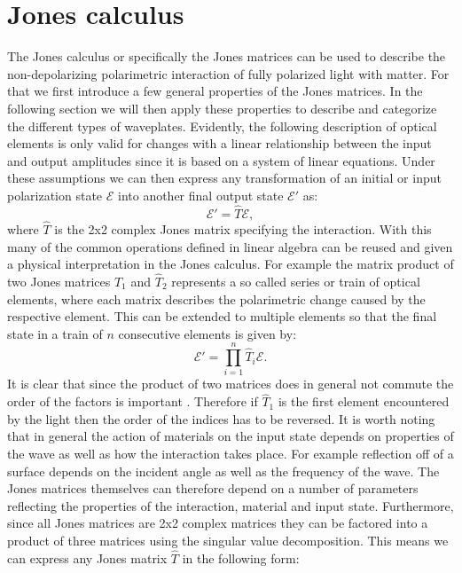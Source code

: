 
\section{Jones calculus}
\label{sec:jonescalc}
The Jones calculus or specifically the Jones matrices can be used to describe the non-depolarizing polarimetric interaction of fully polarized light with matter. For that we first introduce a few general properties of the Jones matrices. In the following section we will then apply these properties to describe and categorize the different types of waveplates. Evidently, the following description of optical elements is only valid for changes with a linear relationship between the input and output amplitudes since it is based on a system of linear equations. Under these assumptions we can then express any transformation of an initial or input polarization state $\bm{\mathcal{E}}$ into another final output state $\bm{\mathcal{E}}'$ as:
\begin{equation}
    \bm{\mathcal{E}}' = \hat{T} \bm{\mathcal{E}},
\end{equation}
where $\hat{T}$ is the 2x2 complex Jones matrix specifying the interaction. With this many of the common operations defined in linear algebra can be reused and given a physical interpretation in the Jones calculus. For example the matrix product of two Jones matrices $\hat{T}_1$ and $\hat{T}_2$ represents a so called series or train of optical elements, where each matrix describes the polarimetric change caused by the respective element. This can be extended to multiple elements so that the final state in a train of $n$ consecutive elements is given by:
\begin{equation}
    \label{eq:jones_series_product}
    \bm{\mathcal{E}}' = \prod_{i=1}^{n} \hat{T}_i \bm{\mathcal{E}}.
\end{equation}
It is clear that since the product of two matrices does in general not commute the order of the factors is important \cite{Jones1941}. Therefore if $\hat{T}_1$ is the first element encountered by the light then the order of the indices has to be reversed. It is worth noting that in general the action of materials on the input state depends on properties of the wave as well as how the interaction takes place. For example reflection off of a surface depends on the incident angle as well as the frequency of the wave. The Jones matrices themselves can therefore depend on a number of parameters reflecting the properties of the interaction, material and input state. Furthermore, since all Jones matrices are 2x2 complex matrices they can be factored into a product of three matrices using the singular value decomposition. This means we can express any Jones matrix $\hat{T}$ in the following form:
